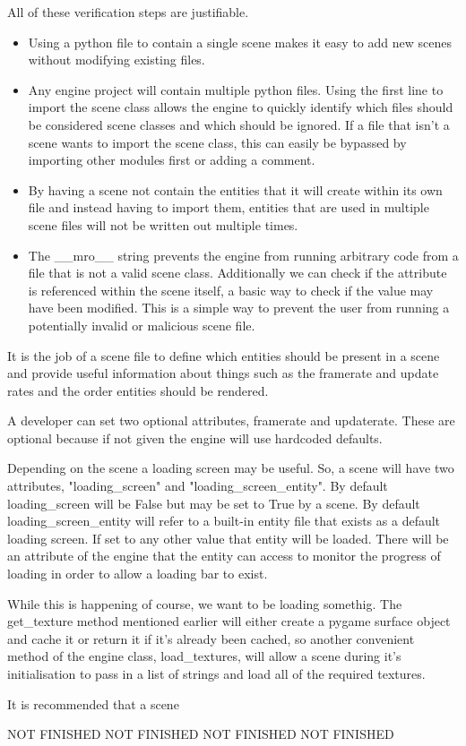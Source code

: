 \documentclass{report}
\begin{document}
All of these verification steps are justifiable.

\begin{itemize}
\renewcommand\labelitemi{--}
    \item Using a python file to contain a single scene makes it easy to add new scenes without modifying existing files.
    \item Any engine project will contain multiple python files. Using the first line to import the scene class allows the engine to quickly identify which files should be considered scene classes and which should be ignored. If a file that isn't a scene wants to import the scene class, this can easily be bypassed by importing other modules first or adding a comment.
    \item By having a scene not contain the entities that it will create within its own file and instead having to import them, entities that are used in multiple scene files will not be written out multiple times.
    \item The \_\_mro\_\_ string prevents the engine from running arbitrary code from a file that is not a valid scene class. Additionally we can check if the attribute is referenced within the scene itself, a basic way to check if the value may have been modified. This is a simple way to prevent the user from running a potentially invalid or malicious scene file.
\end{itemize}

It is the job of a scene file to define which entities should be present in a scene and provide useful information about things such as the framerate and update rates and the order entities should be rendered.

A developer can set two optional attributes, framerate and updaterate. These are optional because if not given the engine will use hardcoded defaults.

Depending on the scene a loading screen may be useful. So, a scene will have two attributes, "loading\_screen" and "loading\_screen\_entity". By default loading\_screen will be False but may be set to True by a scene. By default loading\_screen\_entity will refer to a built-in entity file that exists as a default loading screen. If set to any other value that entity will be loaded. There will be an attribute of the engine that the entity can access to monitor the progress of loading in order to allow a loading bar to exist.

While this is happening of course, we want to be loading somethig. The get\_texture method mentioned earlier will either create a pygame surface object and cache it or return it if it's already been cached, so another convenient method of the engine class, load\_textures, will allow a scene during it's initialisation to pass in a list of strings and load all of the required textures.

It is recommended that a scene 

NOT FINISHED NOT FINISHED NOT FINISHED NOT FINISHED
\end{document}

